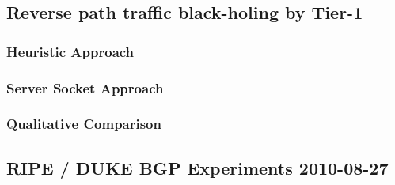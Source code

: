 \subsection{Reverse path traffic black-holing by Tier-1}


\subsubsection{Heuristic Approach}

\subsubsection{Server Socket Approach}

\subsubsection{Qualitative Comparison}


\subsection{RIPE / DUKE BGP Experiments 2010-08-27}

